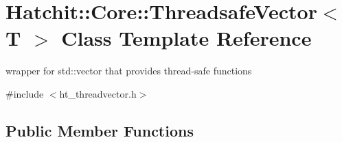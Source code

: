 \hypertarget{classHatchit_1_1Core_1_1ThreadsafeVector}{}\section{Hatchit\+:\+:Core\+:\+:Threadsafe\+Vector$<$ T $>$ Class Template Reference}
\label{classHatchit_1_1Core_1_1ThreadsafeVector}


wrapper for std\+::vector that provides thread-\/safe functions  




{\ttfamily \#include $<$ht\+\_\+threadvector.\+h$>$}

\subsection*{Public Member Functions}
